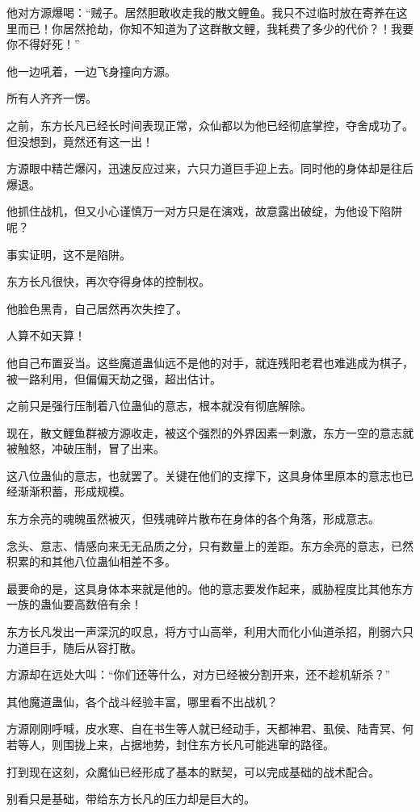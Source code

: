 \begin{this_body}
他对方源爆喝：“贼子。居然胆敢收走我的散文鲤鱼。我只不过临时放在寄养在这里而已！你居然抢劫，你知不知道为了这群散文鲤，我耗费了多少的代价？！我要你不得好死！”

他一边吼着，一边飞身撞向方源。

所有人齐齐一愣。

之前，东方长凡已经长时间表现正常，众仙都以为他已经彻底掌控，夺舍成功了。但没想到，竟然还有这一出！

方源眼中精芒爆闪，迅速反应过来，六只力道巨手迎上去。同时他的身体却是往后爆退。

他抓住战机，但又小心谨慎万一对方只是在演戏，故意露出破绽，为他设下陷阱呢？

事实证明，这不是陷阱。

东方长凡很快，再次夺得身体的控制权。

他脸色黑青，自己居然再次失控了。

人算不如天算！

他自己布置妥当。这些魔道蛊仙远不是他的对手，就连残阳老君也难逃成为棋子，被一路利用，但偏偏天劫之强，超出估计。

之前只是强行压制着八位蛊仙的意志，根本就没有彻底解除。

现在，散文鲤鱼群被方源收走，被这个强烈的外界因素一刺激，东方一空的意志就被触怒，冲破压制，冒了出来。

这八位蛊仙的意志，也就罢了。关键在他们的支撑下，这具身体里原本的意志也已经渐渐积蓄，形成规模。

东方余亮的魂魄虽然被灭，但残魂碎片散布在身体的各个角落，形成意志。

念头、意志、情感向来无无品质之分，只有数量上的差距。东方余亮的意志，已然积累的和其他八位蛊仙相差不多。

最要命的是，这具身体本来就是他的。他的意志要发作起来，威胁程度比其他东方一族的蛊仙要高数倍有余！

东方长凡发出一声深沉的叹息，将方寸山高举，利用大而化小仙道杀招，削弱六只力道巨手，随后从容打散。

方源却在远处大叫：“你们还等什么，对方已经被分割开来，还不趁机斩杀？”

其他魔道蛊仙，各个战斗经验丰富，哪里看不出战机？

方源刚刚呼喊，皮水寒、自在书生等人就已经动手，天都神君、虱侯、陆青冥、何若等人，则围拢上来，占据地势，封住东方长凡可能逃窜的路径。

打到现在这刻，众魔仙已经形成了基本的默契，可以完成基础的战术配合。

别看只是基础，带给东方长凡的压力却是巨大的。


\end{this_body}
